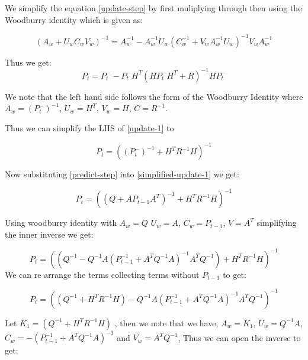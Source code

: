 \documentclass{tufte-handout}
\begin{document}
\begin{enumerate}[(a)]
   We simplify the equation \ref{update-step} by first muliplying through then using the Woodburry identity \cite{ enwiki:1158363831} which is given as:
   
   \begin{equation*}
    (A_w + U_wC_wV_w)^{-1} = A_w^{-1} - A_w^{-1}U_w(C_w^{-1} + V_wA_w^{-1}U_w)^{-1} V_wA_w^{-1}
   \end{equation*}

   Thus we get:
   \begin{equation}
        P_t = P_t^{-} -  P_t^{-}H^T(H P^{-}_{t}H^T + R)^{-1}H P_t^{-}
        \label{update-1}
   \end{equation}
   
   We note that the left hand side follows the form of the Woodburry Identity\cite{enwiki:1158363831} where $A_w = (P_t^{-})^{-1}$, $U_w = H^T$, $V_w = H$, $C = R^{-1}$.
   
   Thus we can simplify the LHS of \ref{update-1} to 

   \begin{equation}
       P_t = ((P_t^{-})^{-1} +   H^TR^{-1}H)^{-1}
       \label{simplified-update-1}
   \end{equation}

    Now substituting \ref{predict-step}  into \ref{simplified-update-1} we get:
    
    \begin{equation}
       P_t = ((Q + AP_{t-1}A^T)^{-1} + H^TR^{-1}H)^{-1}
    \end{equation}

    Using woodburry identity with $A_w = Q$ $U_w = A$, $C_w = P_{t-1}$, $V = A^T$ simplifying the inner inverse we get:
    
    \begin{equation}
       P_t = \left( (Q^{-1} - Q^{-1}A(P_{t-1}^{-1} + A^TQ^{-1}A)^{-1}A^{T}Q^{-1})+ H^TR^{-1}H \right)^{-1}
    \end{equation}
We can re arrange the terms collecting terms without $P_{t-1}$  to get: 

    \begin{equation}
       P_t = \left( (Q^{-1}  + H^TR^{-1}H)   - Q^{-1}A(P_{t-1}^{-1} + A^TQ^{-1}A)^{-1}A^{T}Q^{-1} \right)^{-1}
    \end{equation}

   Let $K_1 =(Q^{-1}  + H^TR^{-1}H)$ , then we note that we have, 
   $A_w = K_1$, $U_w = Q^{-1}A$, $C_w =-(P_{t-1}^{-1} + A^TQ^{-1}A)^{-1} $ and $V_w = A^TQ^{-1}$, Thus we can open the inverse to get:


\end{enumerate}
\end{document}
